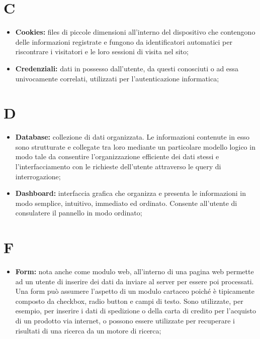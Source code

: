 	\section*{\Huge C} %
		\begin{itemize}
			\item \textbf{Cookies:} files di piccole dimensioni all'interno del dispositivo che contengono delle informazioni registrate e fungono da identificatori automatici per riscontrare i visitatori e le loro sessioni di visita nel sito;
			\item \textbf{Credenziali:} dati in possesso dall'utente, da questi conosciuti o ad essa univocamente correlati, utilizzati per l'autenticazione informatica;
		\end{itemize}

	\section*{\Huge D} %
		\begin{itemize}
			\item \textbf{Database:} collezione di dati organizzata. Le informazioni contenute in esso sono strutturate e collegate tra loro mediante un particolare modello logico in modo tale da consentire l'organizzazione efficiente dei dati stessi e l'interfacciamento con le richieste dell'utente attraverso le query di interrogazione;
			\item \textbf{Dashboard:} interfaccia grafica che organizza e presenta le informazioni in modo semplice, intuitivo, immediato ed ordinato. Consente all'utente di consulatere il pannello in modo ordinato;
		\end{itemize}

	\section*{\Huge F} %
		\begin{itemize}
			\item \textbf{Form:} nota anche come modulo web, all'interno di una pagina web permette ad un utente di inserire dei dati da inviare al server per essere poi processati. Una form può assumere l'aspetto di un modulo cartaceo poiché è tipicamente composto da checkbox, radio button e campi di testo. Sono utilizzate, per esempio, per inserire i dati di spedizione o della carta di credito per l'acquisto di un prodotto via internet, o possono essere utilizzate per recuperare i risultati di una ricerca da un motore di ricerca;
		\end{itemize}

